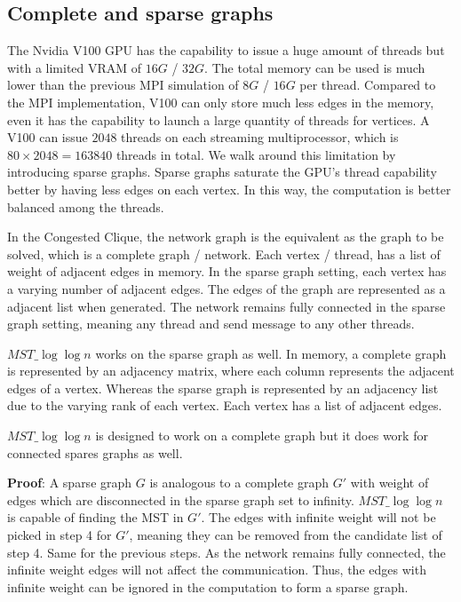 \documentclass[english, 12pt, a4paper, elec, utf8, a-2b, online]{aaltothesis}
\newcommand{\mstalgo}{$MST\_\log\log{n}$}
\begin{document}
\subsection{Complete and sparse graphs}
The Nvidia V100 GPU has the capability to issue a huge amount of threads but with a limited VRAM of $16G$ / $32G$. The total memory can be used is much lower than the previous MPI simulation of $8G$ / $16G$ per thread. Compared to the MPI implementation, V100 can only store much less edges in the memory, even it has the capability to launch a large quantity of threads for vertices. A V100 can issue $2048$ threads on each streaming multiprocessor, which is $80 \times 2048 = 163840$ threads in total. We walk around this limitation by introducing sparse graphs. Sparse graphs saturate the GPU's thread capability better by having less edges on each vertex. In this way, the computation is better balanced among the threads.

In the Congested Clique, the network graph is the equivalent as the graph to be solved, which is a complete graph / network. Each vertex / thread, has a list of weight of adjacent edges in memory. In the sparse graph setting, each vertex has a varying number of adjacent edges. The edges of the graph are represented as a adjacent list when generated. The network remains fully connected in the sparse graph setting, meaning any thread and send message to any other threads.

\mstalgo{} works on the sparse graph as well.
In memory, a complete graph is represented by an adjacency matrix, where each column represents the adjacent edges of a vertex. Whereas the sparse graph is represented by an adjacency list due to the varying rank of each vertex. Each vertex has a list of adjacent edges.

\begin{tcolorbox}[colback=white,colframe=black,boxrule=1pt,arc=0pt]
	\mstalgo{} is designed to work on a complete graph but it does work for connected spares graphs as well.

	\textbf{Proof}: A sparse graph $G$ is analogous to a complete graph $G'$ with weight of edges which are disconnected in the sparse graph set to infinity. \mstalgo{} is capable of finding the MST in $G'$. The edges with infinite weight will not be picked in step 4 for $G'$, meaning they can be removed from the candidate list of step 4. Same for the previous steps. As the network remains fully connected, the infinite weight edges will not affect the communication. Thus, the edges with infinite weight can be ignored in the computation to form a sparse graph.
\end{tcolorbox}
\end{document}
